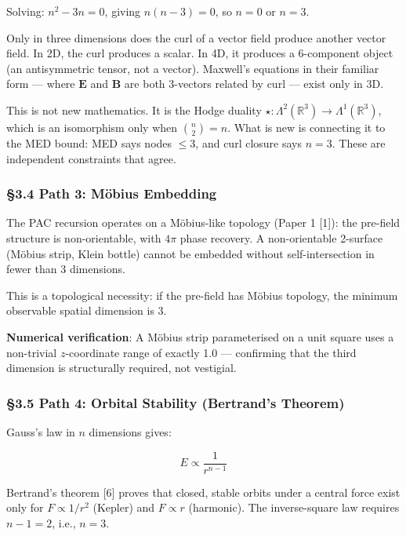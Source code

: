 \documentclass[
  11pt,
  a4paper]{article}
\begin{document}
Solving: \(n^2 - 3n = 0\), giving \(n(n-3) = 0\), so \(n = 0\) or
\(n = 3\).

Only in three dimensions does the curl of a vector field produce another
vector field. In 2D, the curl produces a scalar. In 4D, it produces a
6-component object (an antisymmetric tensor, not a vector). Maxwell's
equations in their familiar form --- where \(\mathbf{E}\) and
\(\mathbf{B}\) are both 3-vectors related by curl --- exist only in 3D.

This is not new mathematics. It is the Hodge duality
\(\star: \Lambda^2(\mathbb{R}^3) \to \Lambda^1(\mathbb{R}^3)\), which is
an isomorphism only when \(\binom{n}{2} = n\). What is new is connecting
it to the MED bound: MED says nodes \(\leq 3\), and curl closure says
\(n = 3\). These are independent constraints that agree.

\subsubsection{§3.4 Path 3: Möbius
Embedding}\label{path-3-muxf6bius-embedding}

The PAC recursion operates on a Möbius-like topology (Paper 1 {[}1{]}):
the pre-field structure is non-orientable, with \(4\pi\) phase recovery.
A non-orientable 2-surface (Möbius strip, Klein bottle) cannot be
embedded without self-intersection in fewer than 3 dimensions.

This is a topological necessity: if the pre-field has Möbius topology,
the minimum observable spatial dimension is 3.

\textbf{Numerical verification}: A Möbius strip parameterised on a unit
square uses a non-trivial \(z\)-coordinate range of exactly 1.0 ---
confirming that the third dimension is structurally required, not
vestigial.

\subsubsection{§3.5 Path 4: Orbital Stability (Bertrand's
Theorem)}\label{path-4-orbital-stability-bertrands-theorem}

Gauss's law in \(n\) dimensions gives:

\[E \propto \frac{1}{r^{n-1}}\]

Bertrand's theorem {[}6{]} proves that closed, stable orbits under a
central force exist only for \(F \propto 1/r^2\) (Kepler) and
\(F \propto r\) (harmonic). The inverse-square law requires
\(n - 1 = 2\), i.e., \(n = 3\).
\end{document}

